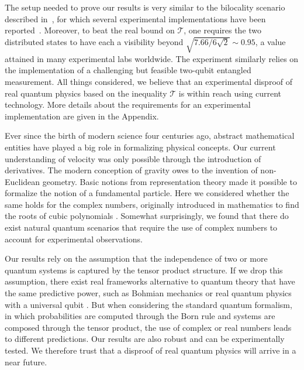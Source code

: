 \documentclass[onecolumn,prx,amsmath,amssymb,12pt]{revtex4-2}
\begin{document}
The setup needed to prove our results is very similar to the bilocality scenario described in~\cite{bilocality}, for which several experimental implementations have been reported~\cite{sciarrino,pryde,pan, Baumer2020}. Moreover, to beat the real bound on $\mathscr{T}$, one requires the two distributed states to have each a visibility beyond $\sqrt{7.66/6\sqrt 2}\sim 0.95$, a value attained in many experimental labs worldwide. The experiment similarly relies on the implementation of a challenging \cite{Bell_meas_impossible} but feasible \cite{Bell_meas_possible} two-qubit entangled measurement. All things considered, we believe that an experimental disproof of real quantum physics based on the inequality $\mathscr{T}$ is within reach using current technology. More details about the requirements for an experimental implementation are given in the Appendix.

Ever since the birth of modern science four centuries ago, abstract mathematical entities have played a big role in formalizing physical concepts. Our current understanding of velocity was only possible through the introduction of derivatives. The modern conception of gravity owes to the invention of non-Euclidean geometry. Basic notions from representation theory made it possible to formalize the notion of a fundamental particle. Here we considered whether the same holds for the complex numbers, originally introduced in mathematics to find the roots of cubic polynomials \cite{complex_numbers}. Somewhat surprisingly, we found that there do exist natural quantum scenarios that require the use of complex numbers to account for experimental observations. 

Our results rely on the assumption that the independence of two or more quantum systems is captured by the tensor product structure. If we drop this assumption, there exist real frameworks alternative to quantum theory that have the same predictive power, such as Bohmian mechanics \cite{Bohm} or real quantum physics with a universal qubit \cite{Aleksandrova_2013}. But when considering the standard quantum formalism, in which probabilities are computed through the Born rule and systems are composed through the tensor product, the use of complex or real numbers leads to different predictions. Our results are also robust and can be experimentally tested. We therefore trust that a disproof of real quantum physics will arrive in a near future.
\end{document}
